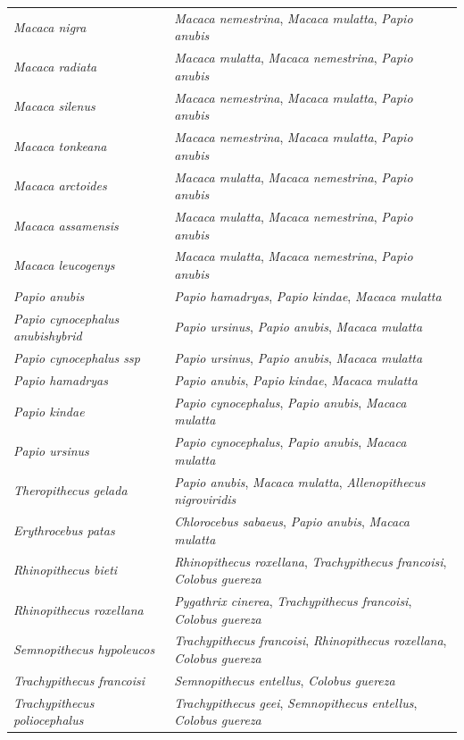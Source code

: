 \begin{center}
\begin{longtable}{p{} p{}}
        \textit{Macaca nigra} & \textit{Macaca nemestrina}, \textit{Macaca mulatta}, \textit{Papio anubis} \\
        \textit{Macaca radiata} & \textit{Macaca mulatta}, \textit{Macaca nemestrina}, \textit{Papio anubis} \\
        \textit{Macaca silenus} & \textit{Macaca nemestrina}, \textit{Macaca mulatta}, \textit{Papio anubis} \\
        \textit{Macaca tonkeana} & \textit{Macaca nemestrina}, \textit{Macaca mulatta}, \textit{Papio anubis} \\
        \textit{Macaca arctoides} & \textit{Macaca mulatta}, \textit{Macaca nemestrina}, \textit{Papio anubis} \\
        \textit{Macaca assamensis} & \textit{Macaca mulatta}, \textit{Macaca nemestrina}, \textit{Papio anubis} \\
        \textit{Macaca leucogenys} & \textit{Macaca mulatta}, \textit{Macaca nemestrina}, \textit{Papio anubis} \\
        \textit{Papio anubis} & \textit{Papio hamadryas}, \textit{Papio kindae}, \textit{Macaca mulatta} \\
        \textit{Papio cynocephalus anubishybrid} & \textit{Papio ursinus}, \textit{Papio anubis}, \textit{Macaca mulatta} \\
        \textit{Papio cynocephalus ssp} & \textit{Papio ursinus}, \textit{Papio anubis}, \textit{Macaca mulatta} \\
        \textit{Papio hamadryas} & \textit{Papio anubis}, \textit{Papio kindae}, \textit{Macaca mulatta} \\
        \textit{Papio kindae} & \textit{Papio cynocephalus}, \textit{Papio anubis}, \textit{Macaca mulatta} \\
        \textit{Papio ursinus} & \textit{Papio cynocephalus}, \textit{Papio anubis}, \textit{Macaca mulatta} \\
        \textit{Theropithecus gelada} & \textit{Papio anubis}, \textit{Macaca mulatta}, \textit{Allenopithecus nigroviridis} \\
        \textit{Erythrocebus patas} & \textit{Chlorocebus sabaeus}, \textit{Papio anubis}, \textit{Macaca mulatta} \\
        \textit{Rhinopithecus bieti} & \textit{Rhinopithecus roxellana}, \textit{Trachypithecus francoisi}, \textit{Colobus guereza} \\
        \textit{Rhinopithecus roxellana} & \textit{Pygathrix cinerea}, \textit{Trachypithecus francoisi}, \textit{Colobus guereza} \\
        \textit{Semnopithecus hypoleucos} & \textit{Trachypithecus francoisi}, \textit{Rhinopithecus roxellana}, \textit{Colobus guereza} \\
        \textit{Trachypithecus francoisi} & \textit{Semnopithecus entellus}, \textit{Colobus guereza} \\
        \textit{Trachypithecus poliocephalus} & \textit{Trachypithecus geei}, \textit{Semnopithecus entellus}, \textit{Colobus guereza} \\
    \end{longtable}
\end{center}
